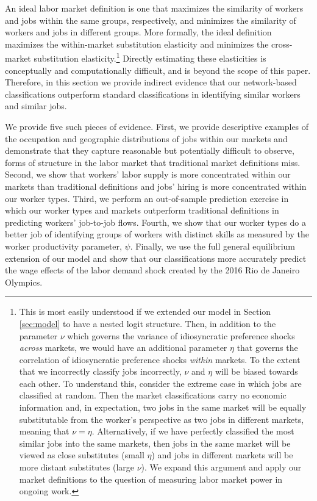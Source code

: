 \documentclass[12pt]{article}
\theoremstyle{definition}
\theoremstyle{plain}
\begin{document}
An ideal labor market definition is one that maximizes the similarity of workers and jobs within the same groups, respectively, and minimizes the similarity of workers and jobs in different groups. More formally, the ideal definition maximizes the within-market substitution elasticity and minimizes the cross-market substitution elasticity.\footnote{This is most easily understood if we extended our model in Section \ref{sec:model} to have a nested logit structure. Then, in addition to the parameter $\nu$ which governs the variance of idiosyncratic preference shocks \emph{across} markets, we would have an additional parameter $\eta$ that governs the correlation of idiosyncratic preference shocks \emph{within} markets. To the extent that we incorrectly classify jobs incorrectly, $\nu$ and $\eta$ will be biased towards each other. To understand this, consider the extreme case in which jobs are classified at random. Then the market classifications carry no economic information and, in expectation, two jobs in the same market will be equally substitutable from the worker's perspective as two jobs in different markets, meaning that $\nu=\eta$. Alternatively, if we have perfectly classified the most similar jobs into the same markets, then jobs in the same market will be viewed as close substitutes (small $\eta$) and jobs in different markets will be more distant substitutes (large $\nu$). We expand this argument and apply our market definitions to the question of measuring labor market power in ongoing work.} Directly estimating these elasticities is conceptually and computationally difficult, and is beyond the scope of this paper. Therefore, in this section we provide indirect evidence that our network-based classifications outperform standard classifications in identifying similar workers and similar jobs. 

We provide five such pieces of evidence. First, we provide descriptive examples of the occupation and geographic distributions of jobs within our markets and demonstrate that they capture reasonable but potentially difficult to observe, forms of structure in the labor market that traditional market definitions miss. Second, we show that workers' labor supply is more concentrated  within our markets than traditional definitions and jobs' hiring is more concentrated within our worker types. Third, we perform an out-of-sample prediction exercise in which our worker types and markets outperform traditional definitions in predicting workers' job-to-job flows. Fourth, we show that our worker types do a better job of identifying groups of workers with distinct skills as measured by the worker productivity parameter, $\psi$. Finally, we use the full general equilibrium extension of our model and show that our classifications more accurately predict the wage effects of the labor demand shock created by the 2016 Rio de Janeiro Olympics. 
\end{document}
